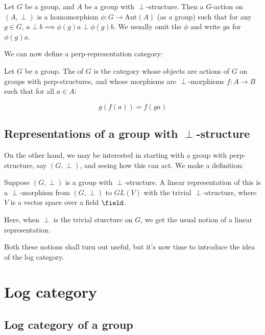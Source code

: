 \documentclass[a4paper]{amsart}
\newcommand{\aut}[1]{\text{Aut}\left(#1\right)}
\begin{document}
\begin{definer}\label{groupactonperp}
  Let $G$ be a group, and $A$ be a group with $\perp$-structure. Then
  a $G$-action on $(A,\perp)$ is a homomorphism $\phi:G \to \aut{A}$
  (as a group) such that for any $g \in G$, $a \perp b \implies
  \phi(g)a \perp \phi(g)b$. We usually omit the $\phi$ and write $ga$
  for $\phi(g)a$.
\end{definer}

We can now define a perp-representation category:

\begin{definer}
  Let $G$ be a group. The  of
  $G$ is the category whose objects are actions of $G$ on groups with
  perp-structures, and whose morphisms are $\perp$-morphisms $f:A \to
  B$ such that for all $a \in A$:

  $$g(f(a)) = f(ga)$$
\end{definer}

\subsection{Representations of a group with $\perp$-structure}

On the other hand, we may be interested in starting with a group with
perp-structure, say $(G,\perp)$, and seeing how this can act. We make
a definition:

\begin{definer}
  Suppose $(G,\perp)$ is a group with $\perp$-structure. A linear
  representation of this is a $\perp$-morphism from $(G,\perp)$ to
  $GL(V)$ with the trivial $\perp$-structure, where $V$ is a vector space
  over a field $\field$.
\end{definer}

Here, when $\perp$ is the trivial sturcture on $G$, we get the usual
notion of a linear representation.

Both these notions shall turn out useful, but it's now time to
introduce the idea of the log category.

\section{Log category}

\subsection{Log category of a group}
\end{document}
